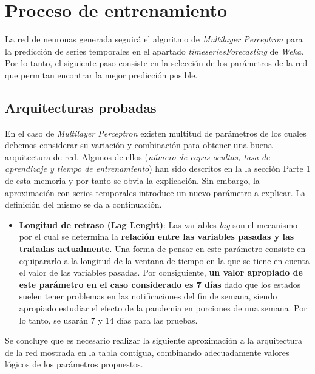 \documentclass[12pt,a4paper, xcolor=table]{article}
\begin{document}
\section{Proceso de entrenamiento}
La red de neuronas generada seguirá el algoritmo de \textit{Multilayer Perceptron }para la predicción de series temporales en el apartado \textit{timeseriesForecasting} de \textit{Weka}. Por lo tanto, el siguiente paso consiste en la selección de los parámetros de la red que permitan encontrar la mejor predicción posible.

    \subsection{Arquitecturas probadas}

    En el caso de \textit{Multilayer Perceptron } existen multitud de parámetros de los cuales debemos considerar su variación y combinación para obtener una buena arquitectura de red. Algunos de ellos (\textit{número de capas ocultas, tasa de aprendizaje y tiempo de entrenamiento}) han sido descritos en la la sección Parte 1 de esta memoria y por tanto se obvia la explicación. Sin embargo, la aproximación con series temporales introduce un nuevo parámetro a explicar. La definición del mismo se da a continuación.

    \begin{itemize}
    \item \textbf{Longitud de retraso (Lag Lenght)}: Las variables \textit{lag} son el mecanismo por el cual se determina la \textbf{relación entre las variables pasadas y las tratadas actualmente}. Una forma de pensar en este parámetro consiste en equipararlo a la longitud de la ventana de tiempo en la que se tiene en cuenta el valor de las variables pasadas. Por consiguiente, \textbf{un valor apropiado de este parámetro en el caso considerado es 7 días} dado que los estados suelen tener problemas en las notificaciones del fin de semana, siendo apropiado estudiar el efecto de la pandemia en porciones de una semana. Por lo tanto, se usarán 7 y 14 días para las pruebas.
    \end{itemize}

    Se concluye que es necesario realizar la siguiente aproximación a la arquitectura de la red mostrada en la tabla contigua, combinando adecuadamente valores lógicos de los parámetros propuestos.
\end{document}
